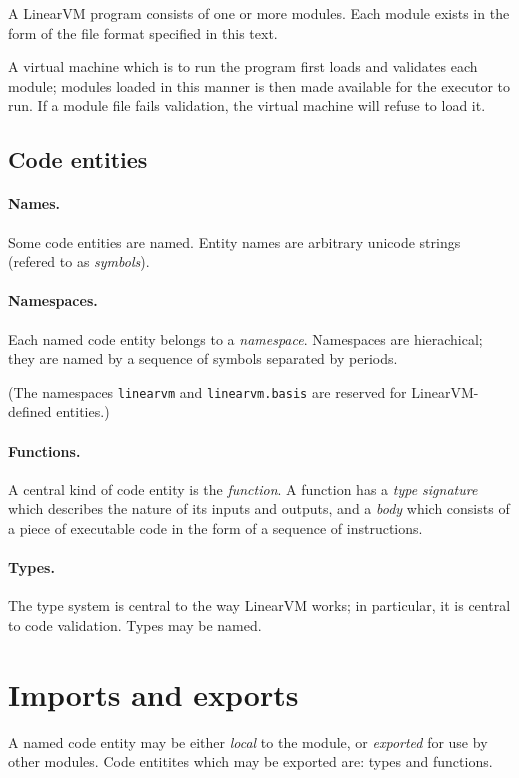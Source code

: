 \documentclass[a4paper]{report}
\begin{document}
A LinearVM program consists of one or more modules.
Each module exists in the form of the file format specified in this
text.

A virtual machine which is to run the program first loads and
validates each module; modules loaded in this manner is then made
available for the executor to run.  If a module file fails validation,
the virtual machine will refuse to load it.

\subsection{Code entities}

\paragraph{Names.}
Some code entities are named.  Entity names are arbitrary unicode
strings (refered to as \emph{symbols}).

\paragraph{Namespaces.}
Each named code entity belongs to a \emph{namespace}.  Namespaces are
hierachical; they are named by a sequence of symbols separated by
periods.

(The namespaces \texttt{linearvm} and \texttt{linearvm.basis} are reserved for LinearVM-defined entities.)

\paragraph{Functions.}
A central kind of code entity is the \emph{function}.
A function has a \emph{type signature} which describes the nature of its inputs and outputs, and a \emph{body} which consists of a piece of executable code in the form of a sequence of instructions.

\paragraph{Types.}
The type system is central to the way LinearVM works; in particular, it is central to code validation.
Types may be named.

\section{Imports and exports}
A named code entity may be either \emph{local} to the module, or \emph{exported} for use by other modules.
Code entitites which may be exported are: types and functions.
\end{document}
